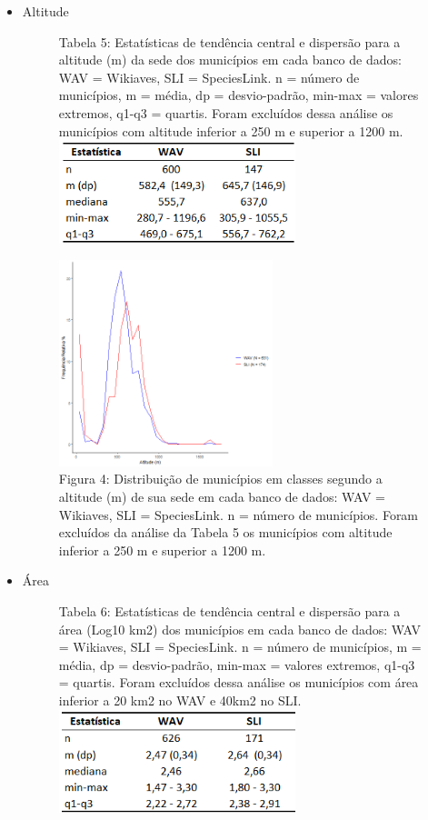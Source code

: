 \begin{itemize}
\newpage

\item Altitude

\begin{figure}[h!]
\centering
{\scriptsize Tabela 5: Estatísticas de tendência central e dispersão para a altitude (m) da sede dos municípios em cada banco de dados: WAV = Wikiaves, SLI = SpeciesLink. n = número de municípios, m = média, dp = desvio-padrão, min-max = valores extremos, q1-q3 = quartis. Foram excluídos dessa análise os municípios com altitude inferior a 250 m e superior a 1200 m.}
\\
\includegraphics[height = 3cm]{Tabelas/5.png}
\end{figure}

\begin{figure}[h!]
\centering
\includegraphics[height = 6cm]{Imagens/213.png}
\\{\scriptsize Figura 4: Distribuição de municípios em classes segundo a altitude (m) de sua sede em cada banco de dados: WAV = Wikiaves, SLI = SpeciesLink. n = número de municípios. Foram excluídos da análise da Tabela 5 os municípios com altitude inferior a 250 m e superior a 1200 m.}
\end{figure}

\item Área

\begin{figure}[h!]
\centering
{\scriptsize Tabela 6: Estatísticas de tendência central e dispersão para a área (Log10 km2) dos municípios em cada banco de dados: WAV = Wikiaves, SLI = SpeciesLink. n = número de municípios, m = média, dp = desvio-padrão, min-max = valores extremos, q1-q3 = quartis. Foram excluídos dessa análise os municípios com área inferior a 20 km2 no WAV e 40km2 no SLI.}
\\
\includegraphics[height = 3cm]{Tabelas/6.png}
\end{figure}


\end{itemize}
